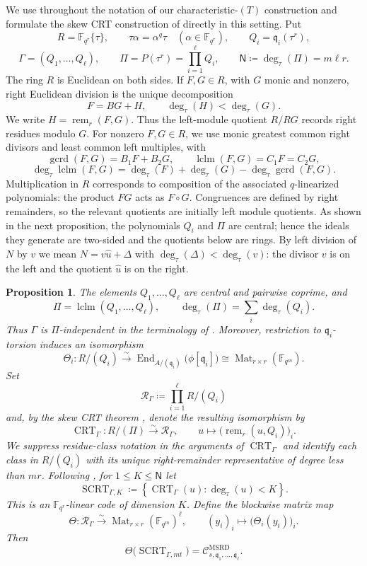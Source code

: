 \documentclass[10pt,a4paper]{amsart}
\DeclareMathOperator{\End}{End}
\DeclareMathOperator{\Mat}{Mat}
\theoremstyle{definition}
\theoremstyle{plain}
\newtheorem{proposition}[definition]{Proposition}
\theoremstyle{remark}
\newcommand{\vF}{\mathbb F}
\begin{document}
We use throughout the notation of our characteristic-$(T)$ construction and
formulate the skew CRT construction of \cite{NR26} directly in this setting.
Put
$$
R=\vF_{q^r}\{\tau\},
\qquad
\tau\alpha=\alpha^q\tau
\quad(\alpha\in\vF_{q^r}),
\qquad
Q_i=\mathfrak q_i(\tau^r),
$$
$$
\Gamma=(Q_1,\ldots,Q_\ell),
\qquad
\Pi=P(\tau^r)=\prod_{i=1}^{\ell}Q_i,
\qquad
\mathsf N\coloneqq\deg_\tau(\Pi)=m\ell r.
$$
The ring $R$ is Euclidean on both sides. If $F,G\in R$, with $G$ monic and
nonzero, right Euclidean division is the unique decomposition
$$
F=BG+H,
\qquad
\deg_\tau(H)<\deg_\tau(G).
$$
We write $H=\operatorname{rem}_r(F,G)$. Thus the left-module quotient
$R/RG$ records right residues modulo $G$. For nonzero $F,G\in R$, we use
monic greatest common right divisors and least common left multiples, with
$$
\operatorname{gcrd}(F,G)=B_1F+B_2G,
\qquad
\operatorname{lclm}(F,G)=C_1F=C_2G,
$$
$$
\deg_\tau\operatorname{lclm}(F,G)
=
\deg_\tau(F)+\deg_\tau(G)
-\deg_\tau\operatorname{gcrd}(F,G).
$$
Multiplication in $R$ corresponds to composition of the associated
$q$-linearized polynomials: the product $FG$ acts as $F\circ G$. Congruences
are defined by right remainders, so the relevant quotients are initially left
module quotients.
As shown in the next proposition, the polynomials $Q_i$ and $\Pi$ are
central; hence the ideals they generate are two-sided and the quotients below
are rings. By left division of $N$ by $v$ we mean
$N=v\widehat u+\Delta$ with
$\deg_\tau(\Delta)<\deg_\tau(v)$: the divisor $v$ is on the left and the
quotient $\widehat u$ is on the right.

\begin{proposition}
The elements $Q_1,\ldots,Q_\ell$ are central and pairwise coprime, and
$$
\Pi=\operatorname{lclm}(Q_1,\ldots,Q_\ell),
\qquad
\deg_\tau(\Pi)=\sum_i\deg_\tau(Q_i).
$$
Thus $\Gamma$ is $\Pi$-independent in the terminology of
\cite[Definition~4]{NR26}. Moreover,
restriction to $\mathfrak q_i$-torsion induces an isomorphism
$$
\Theta_i:R/(Q_i)
\xrightarrow{\sim}
\End_{A/(\mathfrak q_i)}\bigl(\phi[\mathfrak q_i]\bigr)
\cong
\Mat_{r\times r}(\vF_{q^m}).
$$
Set
$$
\mathcal R_\Gamma\coloneqq\prod_{i=1}^{\ell}R/(Q_i)
$$
and, by the skew CRT theorem \cite[Theorem~1]{NR26}, denote the resulting
isomorphism by
$$
\operatorname{CRT}_\Gamma:R/(\Pi)\xrightarrow{\sim}\mathcal R_\Gamma,
\qquad
u\longmapsto\bigl(\operatorname{rem}_r(u,Q_i)\bigr)_i.
$$
We suppress residue-class notation in the arguments of
$\operatorname{CRT}_\Gamma$ and identify each class in $R/(Q_i)$ with its
unique right-remainder representative of degree less than $mr$.
Following \cite[Definition~5]{NR26}, for $1\leq K\leq\mathsf N$ let
$$
\operatorname{SCRT}_{\Gamma,K}
\coloneqq
\left\{\operatorname{CRT}_\Gamma(u):\deg_\tau(u)<K\right\}.
$$
This is an $\vF_{q^r}$-linear code of dimension $K$. Define the blockwise
matrix map
$$
\Theta:\mathcal R_\Gamma
\xrightarrow{\sim}
\Mat_{r\times r}(\vF_{q^m})^\ell,
\qquad
(y_i)_i\longmapsto\bigl(\Theta_i(y_i)\bigr)_i.
$$
Then
$$
\Theta\bigl(\operatorname{SCRT}_{\Gamma,mt}\bigr)
=
\mathcal C^{\mathrm{MSRD}}_{s,\mathfrak q_1,\ldots,\mathfrak q_\ell}.
$$
\end{proposition}
\end{document}
